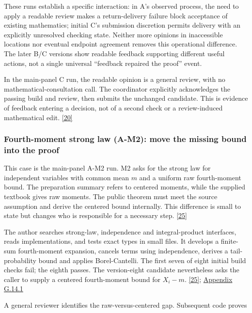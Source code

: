 These runs establish a specific interaction: in A's observed process, the need to apply a readable review makes a return-delivery failure block acceptance of existing mathematics; initial C's submission discretion permits delivery with an explicitly unresolved checking state. Neither more opinions in inaccessible locations nor eventual endpoint agreement removes this operational difference. The later B/C versions show readable feedback supporting different useful actions, not a single universal “feedback repaired the proof” event.

In the main-panel C run, the readable opinion is a general review, with no mathematical-consultation call. The coordinator explicitly acknowledges the passing build and review, then submits the unchanged candidate. This is evidence of feedback entering a decision, not of a second check or a review-induced mathematical edit. \href{en.pdf\#ref-20}{\mbox{[20]}}

\subsubsection[Fourth-moment strong law (A-M2): move the missing bound into the proof]{\texorpdfstring{\protect\hypertarget{r2-2}{}Fourth-moment strong law (A-M2): move the missing bound into the proof}{Fourth-moment strong law (A-M2): move the missing bound into the proof}}
This case is the main-panel A-M2 run. M2 asks for the strong law for independent variables with common mean $m$ and a uniform raw fourth-moment bound. The preparation summary refers to centered moments, while the supplied textbook gives raw moments. The public theorem must meet the source assumption and derive the centered bound internally. This difference is small to state but changes who is responsible for a necessary step. \href{en.pdf\#ref-25}{\mbox{[25]}}

The author searches strong-law, independence and integral-product interfaces, reads implementations, and tests exact types in small files. It develops a finite-sum fourth-moment expansion, cancels terms using independence, derives a tail-probability bound and applies Borel-Cantelli. The first seven of eight initial build checks fail; the eighth passes. The version-eight candidate nevertheless asks the caller to supply a centered fourth-moment bound for $X_i-m$. \href{en.pdf\#ref-25}{\mbox{[25]}}; \href{en-appendix.pdf\#g14-1}{Appendix G.14.1}

A general reviewer identifies the raw-versus-centered gap. Subsequent code proves

